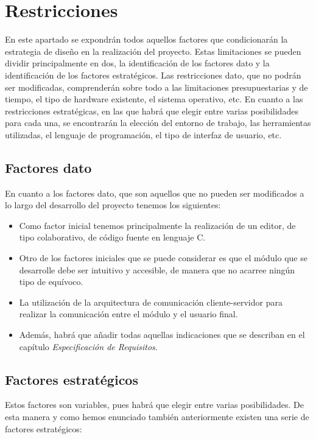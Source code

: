 \section{Restricciones}

En este apartado se expondrán todos aquellos factores que condicionarán la estrategia de diseño en la realización del proyecto. Estas limitaciones se pueden dividir principalmente en dos, la identificación de los factores dato y la identificación de los factores estratégicos. Las restricciones dato, que no podrán ser modificadas, comprenderán sobre todo a las limitaciones presupuestarias y de tiempo, el tipo de hardware existente, el sistema operativo, etc. En cuanto a las restricciones estratégicas, en las que habrá que elegir entre varias posibilidades para cada una, se encontrarán la elección del entorno de trabajo, las herramientas utilizadas, el lenguaje de programación, el tipo de interfaz de usuario, etc.

\subsection{Factores dato}

En cuanto a los factores dato, que son aquellos que no pueden ser modificados a lo largo del desarrollo del proyecto tenemos los siguientes:

\begin{itemize}
	\item Como factor inicial tenemos principalmente la realización de un editor, de tipo colaborativo, de código fuente en lenguaje C.
	\item Otro de los factores iniciales que se puede considerar es que el módulo que se desarrolle debe ser intuitivo y accesible, de manera que no acarree ningún tipo de equívoco.
	\item La utilización de la arquitectura de comunicación cliente-servidor para realizar la comunicación entre el módulo y el usuario final. 
	\item Además, habrá que añadir todas aquellas indicaciones que se describan en el capítulo \emph{Especificación de Requisitos}.
\end{itemize}

\subsection{Factores estratégicos}

Estos factores son variables, pues habrá que elegir entre varias posibilidades. De esta manera y como hemos enunciado también anteriormente existen una serie de factores estratégicos:

